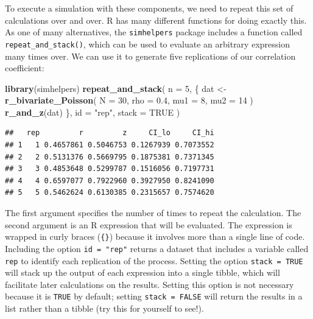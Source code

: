 \documentclass[
]{book}
\newenvironment{Shaded}{\begin{snugshade}}{\end{snugshade}}
\newcommand{\AttributeTok}[1]{\textcolor[rgb]{0.13,0.29,0.53}{#1}}
\newcommand{\ConstantTok}[1]{\textcolor[rgb]{0.56,0.35,0.01}{#1}}
\newcommand{\DecValTok}[1]{\textcolor[rgb]{0.00,0.00,0.81}{#1}}
\newcommand{\FloatTok}[1]{\textcolor[rgb]{0.00,0.00,0.81}{#1}}
\newcommand{\FunctionTok}[1]{\textcolor[rgb]{0.13,0.29,0.53}{\textbf{#1}}}
\newcommand{\NormalTok}[1]{#1}
\newcommand{\OtherTok}[1]{\textcolor[rgb]{0.56,0.35,0.01}{#1}}
\newcommand{\StringTok}[1]{\textcolor[rgb]{0.31,0.60,0.02}{#1}}
\begin{document}
To execute a simulation with these components, we need to repeat this set of calculations over and over.
R has many different functions for doing exactly this.
As one of many alternatives, the \texttt{simhelpers} package includes a function called \texttt{repeat\_and\_stack()}, which can be used to evaluate an arbitrary expression many times over.
We can use it to generate five replications of our correlation coefficient:

\begin{Shaded}
\begin{Highlighting}[]
\FunctionTok{library}\NormalTok{(simhelpers)}
\FunctionTok{repeat\_and\_stack}\NormalTok{(}
  \AttributeTok{n =} \DecValTok{5}\NormalTok{, }
\NormalTok{  \{}
\NormalTok{    dat }\OtherTok{\textless{}{-}} \FunctionTok{r\_bivariate\_Poisson}\NormalTok{( }\AttributeTok{N =} \DecValTok{30}\NormalTok{, }\AttributeTok{rho =} \FloatTok{0.4}\NormalTok{, }\AttributeTok{mu1 =} \DecValTok{8}\NormalTok{, }\AttributeTok{mu2 =} \DecValTok{14}\NormalTok{ )}
    \FunctionTok{r\_and\_z}\NormalTok{(dat)}
\NormalTok{  \}, }
  \AttributeTok{id =} \StringTok{"rep"}\NormalTok{, }
  \AttributeTok{stack =} \ConstantTok{TRUE}
\NormalTok{)}
\end{Highlighting}
\end{Shaded}

\begin{verbatim}
##   rep         r         z     CI_lo     CI_hi
## 1   1 0.4657861 0.5046753 0.1267939 0.7073552
## 2   2 0.5131376 0.5669795 0.1875381 0.7371345
## 3   3 0.4853648 0.5299787 0.1516056 0.7197731
## 4   4 0.6597077 0.7922960 0.3927950 0.8241090
## 5   5 0.5462624 0.6130385 0.2315657 0.7574620
\end{verbatim}

The first argument specifies the number of times to repeat the calculation.
The second argument is an R expression that will be evaluated.
The expression is wrapped in curly braces (\texttt{\{\}}) because it involves more than a single line of code.
Including the option \texttt{id\ =\ "rep"} returns a dataset that includes a variable called \texttt{rep} to identify each replication of the process.
Setting the option \texttt{stack\ =\ TRUE} will stack up the output of each expression into a single tibble, which will facilitate later calculations on the results.
Setting this option is not necessary because it is \texttt{TRUE} by default; setting \texttt{stack\ =\ FALSE} will return the results in a list rather than a tibble (try this for yourself to see!).
\end{document}

